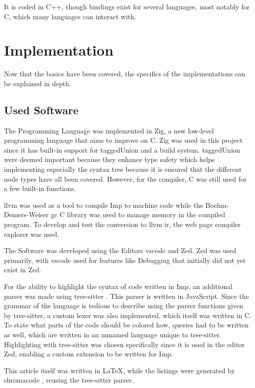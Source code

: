 \documentclass[12pt]{article}
\begin{document}
It is coded in C++, though bindings exist for several languages, most notably
for C, which many languages can interact with.

\section{Implementation}
Now that the basics have been covered, the specifics
of the implementations can be explained in depth.

\subsection{Used Software}
The Programming Language was implemented in Zig, a new low-level programming
language that aims to improve on C. Zig was used in this project since it has built-in
support for \gls{taggedUnion} and a build system. \Gls{taggedUnion} were deemed important because they
enhance type safety which helps implementing especially the syntax tree because it is ensured
that the different node types have all been covered.
However, for the compiler, C was still used for a few built-in functions.

\Gls{llvm} was used as a tool to compile Imp to machine code while the
Boehm-Demers-Weiser \Gls{gc} C library \autocite{GarbageCollector} was
used to manage memory in the compiled program.
To develop and test the conversion to \Gls{llvm} \Gls{ir}, the web page
compiler explorer \cite{godboltCompilerExplorer} was used.

The Software was developed using the Editors \Gls{vscode} and Zed.
Zed was used primarily, with \Gls{vscode} used for features like Debugging
that initially did not yet exist in Zed.

For the ability to highlight the syntax of code written in Imp, an additional parser was made using tree-sitter \autocite{brunsfeldTreesitterTreesitterV025102025}.
This parser is written in JavaScript. Since the grammar of the language is tedious to describe using
the parser functions given by tree-sitter, a custom lexer was also implemented, which itself was written in C.
To state what parts of the code should be colored how, queries had to be written as well,
which are written in an unnamed language unique to tree-sitter.
Highlighting with tree-sitter was chosen specifically since it is used
in the editor Zed, enabling a custom extension to be written for Imp.

This article itself was written in LaTeX, while the listings were generated
by chromacode \autocite{lebedaTomLebedaChroma_code2025}, reusing the tree-sitter parser.
\end{document}
